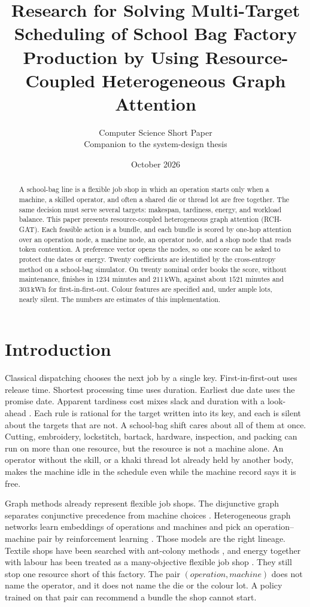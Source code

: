 \documentclass[10pt,a4paper]{article}
\title{\large Research for Solving Multi-Target Scheduling of School Bag Factory Production by Using Resource-Coupled Heterogeneous Graph Attention}
\author{Computer Science Short Paper\\Companion to the system-design thesis}
\date{October 2026}
\begin{document}
\maketitle
\vspace{-1.6em}

\begin{abstract}
\noindent
A school-bag line is a flexible job shop in which an operation starts only when a machine, a skilled operator, and often a shared die or thread lot are free together. The same decision must serve several targets: makespan, tardiness, energy, and workload balance. This paper presents resource-coupled heterogeneous graph attention (RCH-GAT). Each feasible action is a bundle, and each bundle is scored by one-hop attention over an operation node, a machine node, an operator node, and a shop node that reads token contention. A preference vector opens the nodes, so one score can be asked to protect due dates or energy. Twenty coefficients are identified by the cross-entropy method on a school-bag simulator. On twenty nominal order books the score, without maintenance, finishes in \(1234\) minutes and \(211\,\mathrm{kWh}\), against about \(1521\) minutes and \(303\,\mathrm{kWh}\) for first-in-first-out. Colour features are specified and, under ample lots, nearly silent. The numbers are estimates of this implementation.
\end{abstract}

\section{Introduction}

Classical dispatching chooses the next job by a single key. First-in-first-out uses release time. Shortest processing time uses duration. Earliest due date uses the promise date. Apparent tardiness cost mixes slack and duration with a look-ahead \cite{vepsalainen1987}. Each rule is rational for the target written into its key, and each is silent about the targets that are not. A school-bag shift cares about all of them at once. Cutting, embroidery, lockstitch, bartack, hardware, inspection, and packing can run on more than one resource, but the resource is not a machine alone. An operator without the skill, or a khaki thread lot already held by another body, makes the machine idle in the schedule even while the machine record says it is free.

Graph methods already represent flexible job shops. The disjunctive graph separates conjunctive precedence from machine choices \cite{roy1964,adams1988}. Heterogeneous graph networks learn embeddings of operations and machines and pick an operation--machine pair by reinforcement learning \cite{song2023,park2021,zhang2020}. Those models are the right lineage. Textile shops have been searched with ant-colony methods \cite{chen2024}, and energy together with labour has been treated as a many-objective flexible job shop \cite{gong2019}. They still stop one resource short of this factory. The pair \((operation, machine)\) does not name the operator, and it does not name the die or the colour lot. A policy trained on that pair can recommend a bundle the shop cannot start.
\end{document}
